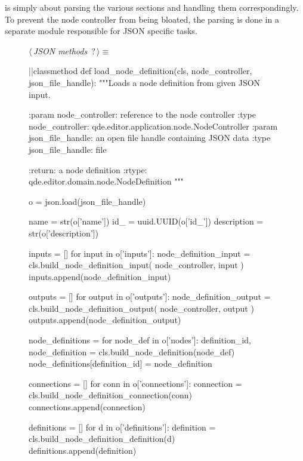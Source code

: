 \documentclass[%
    a4paper,    %
    justified,  %
    nobib,      %
    openany     %
]{tufte-book}
\makeatletter
\renewcommand{\label}[1]{\@tufte@label{##1}}%
\makeatother
\begin{document}
 is simply about parsing the various
sections and handling them correspondingly. To prevent the node controller from
being bloated, the parsing is done in a separate module responsible for JSON
specific tasks.

\begin{figure}
\begin{flushleft} \small
\begin{minipage}{\linewidth}\label{scrap126}\raggedright\small
{} $\langle\,${\itshape JSON methods}\nobreak\ {\footnotesize {?}}$\,\rangle\equiv$
\vspace{-1ex}
\begin{pythoncode}
|\normalfont{}\fontfamily{}|classmethod
def load_node_definition(cls, node_controller, json_file_handle):
    """Loads a node definition from given JSON input.

    :param node_controller: reference to the node controller
    :type node_controller: qde.editor.application.node.NodeController
    :param json_file_handle: an open file handle containing JSON data
    :type json_file_handle: file

    :return: a node definition
    :rtype: qde.editor.domain.node.NodeDefinition
    """

    o = json.load(json_file_handle)

    name        = str(o['name'])
    id_         = uuid.UUID(o['id_'])
    description = str(o['description'])

    inputs = []
    for input in o['inputs']:
        node_definition_input = cls.build_node_definition_input(
            node_controller, input
        )
        inputs.append(node_definition_input)

    outputs = []
    for output in o['outputs']:
        node_definition_output = cls.build_node_definition_output(
            node_controller, output
        )
        outputs.append(node_definition_output)

    node_definitions = {}
    for node_def in o['nodes']:
        definition_id, node_definition = cls.build_node_definition(node_def)
        node_definitions[definition_id] = node_definition

    connections = []
    for conn in o['connections']:
        connection = cls.build_node_definition_connection(conn)
        connections.append(connection)

    definitions = []
    for d in o['definitions']:
        definition = cls.build_node_definition_definition(d)
        definitions.append(definition)


\end{pythoncode}
\end{minipage}
\end{flushleft}
\end{figure}
\end{document}
